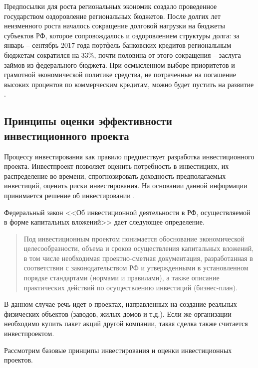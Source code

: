 Предпосылки для роста региональных экономик создало проведенное государством оздоровление региональных бюджетов. После долгих лет неизменного роста началось сокращение долговой нагрузки на бюджеты субъектов РФ, которое сопровождалось и оздоровлением структуры долга: за январь – сентябрь 2017 года портфель банковских кредитов региональным бюджетам сократился на 33\%, почти половина от этого сокращения – заслуга займов из федерального бюджета. При осмысленном выборе приоритетов и грамотной экономической политике средства, не потраченные на погашение высоких процентов по коммерческим кредитам, можно будет пустить на развитие \cite{expertra}.












\subsection{Принципы оценки эффективности инвестиционного проекта}

Процессу инвестирования как правило предшествует разработка инвестиционного проекта. Инвестпроект позволяет оценить потребность в инвестициях, их распределение во времени, спрогнозировать доходность предполагаемых инвестиций, оценить риски инвестирования. На основании данной информации принимается решение об инвестировании \cite[с. 82]{borisova}.

Федеральный закон <<Об инвестиционной деятельности в РФ, осуществляемой в форме капитальных вложений>> \cite{39-fz} дает следующее определение.
\begin{quote}
	Под инвестиционным проектом понимается обоснование экономической целесообразности, объема и сроков осуществления капитальных вложений, в том числе необходимая проектно-сметная документация, разработанная в соответствии с законодательством РФ и утвержденными в установленном порядке стандартами (нормами и правилами), а также описание практических действий по осуществлению инвестиций (бизнес-план).
\end{quote}


В данном случае речь идет о проектах, направленных на создание реальных физических объектов (заводов, жилых домов и т.д.). Если же организации необходимо купить пакет акций другой компании, такая сделка также считается инвестпроектом.

Рассмотрим базовые принципы инвестирования и оценки инвестиционных проектов.

